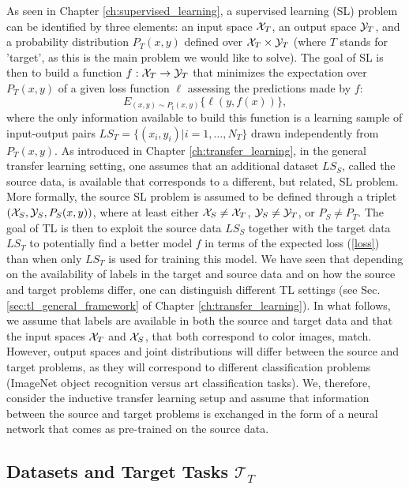 As seen in Chapter \ref{ch:supervised_learning}, a supervised learning (SL) problem can be identified by three elements: an input space ${\cal X}_T$, an output space ${\cal Y}_T$, and a probability distribution $P_T(x,y)$ defined over ${\cal X}_T\times {\cal Y}_T$ (where $T$ stands for 'target', as this is the main problem we would like to solve). The goal of SL is then to build a function $f:{\cal X}_T\rightarrow{\cal Y}_T$ that minimizes the expectation over $P_T(x,y)$ of a given loss function $\ell$ assessing the predictions made by $f$:
\begin{equation}\label{loss}
  E_{(x,y)\sim P_t(x,y)} \{\ell(y,f(x))\},
\end{equation}
where the only information available to build this function is a learning sample of input-output pairs $LS_T=\{(x_i,y_i)|i=1,\ldots,N_T\}$ drawn independently from $P_T(x,y)$. As introduced in Chapter \ref{ch:transfer_learning}, in the general transfer learning setting, one assumes that an additional dataset $LS_S$, called the source data, is available that corresponds to a different, but related, SL problem. More formally, the source SL problem is assumed to be defined through a triplet $({\cal X}_S,{\cal Y}_S,P_S(x,y))$, where at least either ${\cal X}_S\neq {\cal X}_T$, ${\cal Y}_S\neq {\cal Y}_T$, or $P_S\neq P_T$. The goal of TL is then to exploit the source data $LS_S$ together with the target data $LS_T$ to potentially find a better model $f$ in terms of the expected loss (\ref{loss}) than when only $LS_T$ is used for training this model.
We have seen that depending on the availability of labels in the target and source data and on how the source and target problems differ, one can distinguish different TL settings (see Sec. \ref{sec:tl_general_framework} of Chapter \ref{ch:transfer_learning}). In what follows, we assume that labels are available in both the source and target data and that the input spaces ${\cal X}_T$ and ${\cal X}_S$, that both correspond to color images, match. However, output spaces and joint distributions will differ between the source and target problems, as they will correspond to different classification problems (ImageNet object recognition versus art classification tasks). We, therefore, consider the inductive transfer learning setup and assume that information between the source and target problems is exchanged in the form of a neural network that comes as pre-trained on the source data. 

\subsection{Datasets and Target Tasks $\mathcal{T}_T$}
\label{subsec:datasets}


